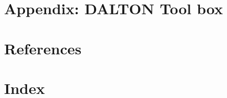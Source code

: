 \documentclass[11pt]{report}
\begin{document}
\part{Appendix: DALTON Tool box}

\part{References}


%
\part{Index}
\printindex
\end{document}
